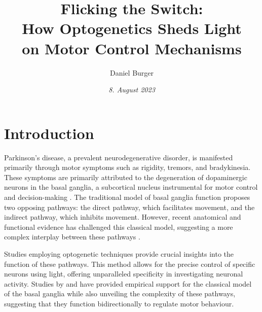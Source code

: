 \documentclass[10pt]{article}
\title{\textbf{Flicking the Switch: } \\ How Optogenetics Sheds Light \\ on Motor Control Mechanisms}
\author[ ]{Daniel Burger}
\affil[ ]{\textbf{King’s College London}}
\affil[ ]{\href{mailto:public@danielburger.online}{public@danielburger.online}}
\date{\textit{8. August 2023}}
\begin{document}


\begin{sloppypar} %





  \doublespacing

  \section{Introduction}
  \label{sec:introduction}

  Parkinson’s disease, a prevalent neurodegenerative disorder, is manifested primarily through motor symptoms such as rigidity, tremors, and bradykinesia. These symptoms are primarily attributed to the degeneration of dopaminergic neurons in the basal ganglia, a subcortical nucleus instrumental for motor control and decision-making \citep{kravitz_regulation_2010}. The traditional model of basal ganglia function proposes two opposing pathways: the direct pathway, which facilitates movement, and the indirect pathway, which inhibits movement. However, recent anatomical and functional evidence has challenged this classical model, suggesting a more complex interplay between these pathways \citep{dunovan_believer-skeptic_2016}.

  Studies employing optogenetic techniques \citep{kravitz_regulation_2010, cui_concurrent_2013} provide crucial insights into the function of these pathways. This method allows for the precise control of specific neurons using light, offering unparalleled specificity in investigating neuronal activity. Studies by \cite{kravitz_regulation_2010} and \cite{cui_concurrent_2013} have provided empirical support for the classical model of the basal ganglia while also unveiling the complexity of these pathways, suggesting that they function bidirectionally \citep{yttri_opponent_2016} to regulate motor behaviour.


\end{sloppypar}
\end{document}
